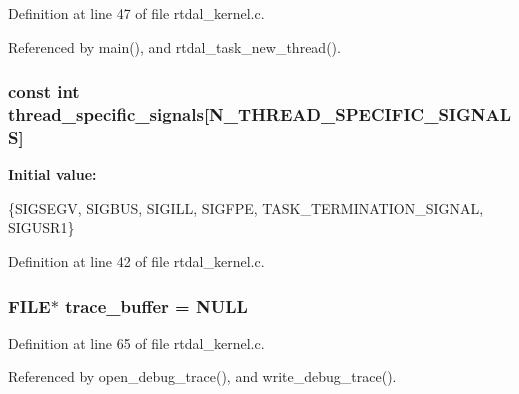 Definition at line 47 of file rtdal\-\_\-kernel.\-c.



Referenced by main(), and rtdal\-\_\-task\-\_\-new\-\_\-thread().

\subsubsection[{thread\-\_\-specific\-\_\-signals}]{\setlength{\rightskip}{0pt plus 5cm}const int thread\-\_\-specific\-\_\-signals[{\bf N\-\_\-\-T\-H\-R\-E\-A\-D\-\_\-\-S\-P\-E\-C\-I\-F\-I\-C\-\_\-\-S\-I\-G\-N\-A\-L\-S}]}\label{rtdal__kernel_8c_a349740abec20c73ff7e70ed54841c7a6}
{\bfseries Initial value\-:}
\begin{DoxyCode}

        \{SIGSEGV, SIGBUS, SIGILL, SIGFPE, TASK_TERMINATION_SIGNAL, SIGUSR1\}
\end{DoxyCode}


Definition at line 42 of file rtdal\-\_\-kernel.\-c.

\subsubsection[{trace\-\_\-buffer}]{\setlength{\rightskip}{0pt plus 5cm}F\-I\-L\-E$\ast$ trace\-\_\-buffer = N\-U\-L\-L}\label{rtdal__kernel_8c_abd0a342fbf3ca1440dd41f34d06c6d07}


Definition at line 65 of file rtdal\-\_\-kernel.\-c.



Referenced by open\-\_\-debug\-\_\-trace(), and write\-\_\-debug\-\_\-trace().

